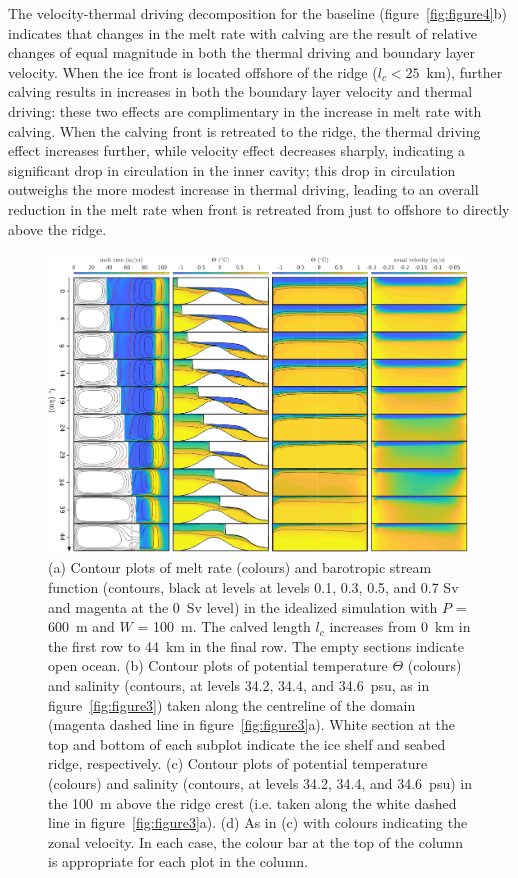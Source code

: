 \documentclass[draft]{agujournal2019}
\begin{document}
The velocity-thermal driving decomposition for the baseline (figure~\ref{fig:figure4}b) indicates that changes in the melt rate with calving are the result of relative changes of equal magnitude in both the thermal driving and boundary layer velocity. When the ice front is located offshore of the ridge ($l_c < 25$~km), further calving results in increases in both the boundary layer velocity and thermal driving: these two effects are complimentary in the increase in melt rate with calving. When the calving front is retreated to the ridge, the thermal driving effect increases further, while velocity effect decreases sharply, indicating a significant drop in circulation in the inner cavity; this drop in circulation outweighs the more modest increase in thermal driving, leading to an overall reduction in the melt rate when front is retreated from just to offshore to directly above the ridge. 

\begin{figure}
    \centering
    \includegraphics[width = 0.99\textwidth]{../make_figures/plots/figure5_axislabel.pdf}
    \caption{(a) Contour plots of melt rate (colours) and barotropic stream function (contours, black at levels at levels 0.1, 0.3, 0.5, and 0.7 Sv and magenta at the 0~Sv level) in the idealized simulation with $P$ = 600~m and $W$ = 100~m. The calved length $l_c$ increases from 0~km in the first row to 44~km in the final row. The empty sections indicate open ocean. (b) Contour plots of potential temperature $\Theta$ (colours) and salinity (contours, at levels 34.2, 34.4, and 34.6~psu, as in figure~\ref{fig:figure3}) taken along the centreline of the domain (magenta dashed line in figure~\ref{fig:figure3}a). White section at the top and bottom of each subplot indicate the ice shelf and seabed ridge, respectively. (c) Contour plots of potential temperature (colours) and salinity (contours, at levels 34.2, 34.4, and 34.6~psu) in the 100~m above the ridge crest (i.e. taken along the white dashed line in figure~\ref{fig:figure3}a). (d) As in (c) with colours indicating the zonal velocity.  In each case, the colour bar at the top of the column is appropriate for each plot in the column.}
    \label{fig:figure5}
\end{figure}
\end{document}
